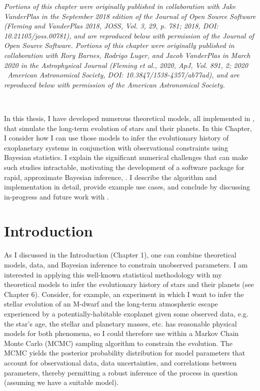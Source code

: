 \textit{Portions of this chapter were originally published in collaboration with Jake VanderPlas in the September 2018 edition of the Journal of Open Source Software (Fleming and VanderPlas 2018, JOSS, Vol. 3, 29, p. 781; 2018, DOI: 10.21105/joss.00781), and are reproduced below with permission of the Journal of Open Source Software. Portions of this chapter were originally published in collaboration with Rory Barnes, Rodrigo Luger, and Jacob VanderPlas in March 2020 in the Astrophysical Journal (Fleming et al., 2020, ApJ, Vol. 891, 2; 2020 \textcopyright \ American Astronomical Society, DOI: 10.3847/1538-4357/ab77ad), and are reproduced below with permission of the American Astronomical Society.}

\

In this thesis, I have developed numerous theoretical models, all implemented in \vplanet, that simulate the long-term evolution of stars and their planets. In this Chapter, I consider how I can use those models to infer the evolutionary history of exoplanetary systems in conjunction with observational constraints using Bayesian statistics. I explain the significant numerical challenges that can make such studies intractable, motivating the development of a software package for rapid, approximate Bayesian inference, \approxposterior \citep{FlemingVanderPlas2018}. I describe the \approxposterior algorithm and implementation in detail, provide example use cases, and conclude by discussing in-progress and future work with \approxposterior. 

\section{Introduction}

As I discussed in the Introduction (Chapter 1), one can combine theoretical models, data, and Bayesian inference to constrain unobserved parameters. I am interested in applying this well-known statistical methodology with my theoretical models to infer the evolutionary history of stars and their planets (see Chapter 6). Consider, for example, an experiment in which I want to infer the stellar evolution of an M-dwarf and the long-term atmospheric escape experienced by a potentially-habitable exoplanet given some observed data, e.g. the star's age, the stellar and planetary masses, etc. \vplanet has reasonable physical models for both phenomena, so I could therefore use \vplanet within a Markov Chain Monte Carlo (MCMC) sampling algorithm to constrain the evolution. The MCMC yields the posterior probability distribution for model parameters that account for observational data, data uncertainties, and correlations between parameters, thereby permitting a robust inference of the process in question (assuming we have a suitable model).


